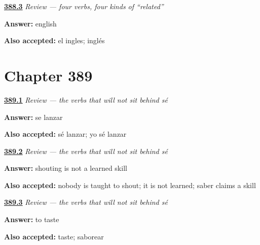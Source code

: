 \noindent\begin{minipage}[t]{\linewidth}
\raggedright
\hyperlink{review-ES-C388-repaso-cuatro-hedges-moved}{\textbf{388.3}} \emph{Review — four verbs, four kinds of \textquotedblleft{}related\textquotedblright{}}\par
\small \textbf{Answer:} english\par
\footnotesize \textbf{Also accepted:} el ingles; inglés
\end{minipage}\par\medskip

\section*{Chapter 389}

\noindent\begin{minipage}[t]{\linewidth}
\raggedright
\hyperlink{review-ES-C389-repaso-se-y-puedo-skill}{\textbf{389.1}} \emph{Review — the verbs that will not sit behind \emph{sé}}\par
\small \textbf{Answer:} se lanzar\par
\footnotesize \textbf{Also accepted:} sé lanzar; yo sé lanzar
\end{minipage}\par\medskip

\noindent\begin{minipage}[t]{\linewidth}
\raggedright
\hyperlink{review-ES-C389-repaso-se-y-puedo-odd}{\textbf{389.2}} \emph{Review — the verbs that will not sit behind \emph{sé}}\par
\small \textbf{Answer:} shouting is not a learned skill\par
\footnotesize \textbf{Also accepted:} nobody is taught to shout; it is not learned; saber claims a skill
\end{minipage}\par\medskip

\noindent\begin{minipage}[t]{\linewidth}
\raggedright
\hyperlink{review-ES-C389-repaso-se-y-puedo-taste}{\textbf{389.3}} \emph{Review — the verbs that will not sit behind \emph{sé}}\par
\small \textbf{Answer:} to taste\par
\footnotesize \textbf{Also accepted:} taste; saborear
\end{minipage}\par\medskip
